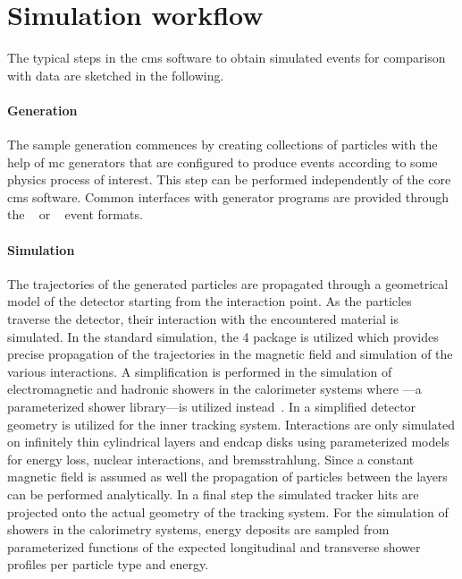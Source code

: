 \section{Simulation workflow}
\label{sec:fsim-workflow}

The typical steps in the \gls{cms} software to obtain simulated events for comparison with data are sketched in the following.

\paragraph{Generation} The sample generation commences by creating collections of particles with the help of \acrfull{mc} generators that are configured to produce events according to some physics process of interest. This step can be performed independently of the core \gls{cms} software. Common interfaces with generator programs are provided through the \HEPMC[format=hyperbf]~\cite{Dobbs:2001ck,hepmc} or \LHEF[format=hyperbf]~\cite{Alwall:2006yp} event formats.

\paragraph{Simulation} The trajectories of the generated particles are propagated through a geometrical model of the detector starting from the interaction point. As the particles traverse the detector, their interaction with the encountered material is simulated. In the standard simulation, the \GEANT{}4 package is utilized which provides precise propagation of the trajectories in the magnetic field and simulation of the various interactions. A simplification is performed in the simulation of electromagnetic and hadronic showers in the calorimeter systems where \GFLASH---a parameterized shower library---is utilized instead~\cite{1742-6596-293-1-012023,RAHMAT2012340}. In \FSIM a simplified detector geometry is utilized for the inner tracking system. Interactions are only simulated on infinitely thin cylindrical layers and endcap disks using parameterized models for energy loss, nuclear interactions, and bremsstrahlung. Since a constant magnetic field is assumed as well the propagation of particles between the layers can be performed analytically. In a final step the simulated tracker hits are projected onto the actual geometry of the tracking system. For the simulation of showers in the calorimetry systems, energy deposits are sampled from parameterized functions of the expected longitudinal and transverse shower profiles per particle type and energy.

